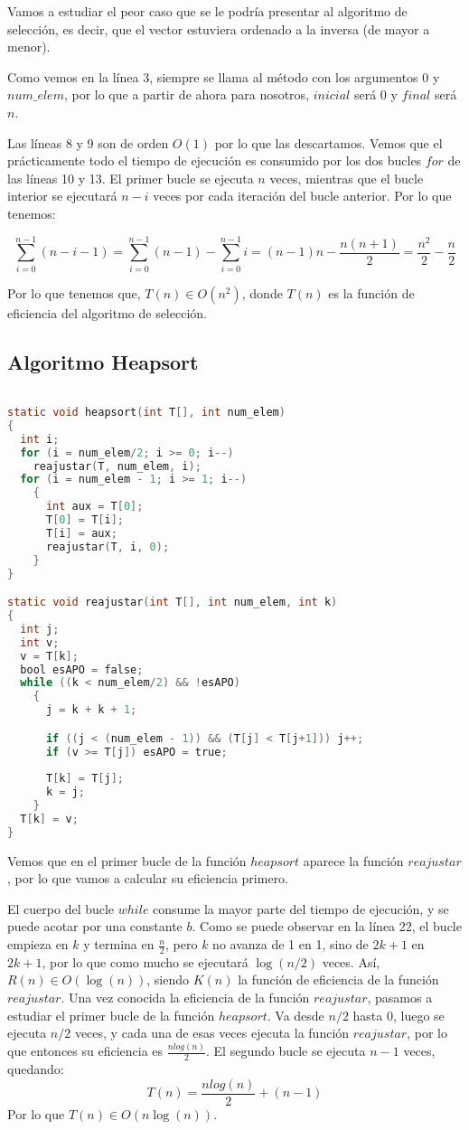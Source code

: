Vamos a estudiar el peor caso que se le podría presentar al algoritmo de selección, es decir, que el vector estuviera ordenado a la inversa (de mayor a menor).

Como vemos en la línea 3, siempre se llama al método con los argumentos $0$ y $num\_elem$, por lo que a partir de ahora para nosotros, $inicial$ será $0$ y $final$ será $n$.

Las líneas 8 y 9 son de orden $O(1)$ por lo que las descartamos. Vemos que el prácticamente todo el tiempo de ejecución es consumido por los dos bucles $for$ de las líneas 10 y 13. El primer bucle se ejecuta $n$ veces, mientras que el bucle interior se ejecutará $n-i$ veces por cada iteración del bucle anterior. Por lo que tenemos:

\[
\sum_{i=0}^{n-1}(n-i-1)=\sum_{i=0}^{n-1}(n-1)-\sum_{i=0}^{n-1}i=(n-1)n-\frac{n(n+1)}{2}=\frac{n^2}{2}-\frac{n}{2}
\]

Por lo que tenemos que, $T(n)\in O(n^2)$, donde $T(n)$ es la función de eficiencia del algoritmo de selección.

\newpage 

\subsection{Algoritmo Heapsort}

\begin{lstlisting}[language=C]

static void heapsort(int T[], int num_elem)
{
  int i;
  for (i = num_elem/2; i >= 0; i--)
    reajustar(T, num_elem, i);
  for (i = num_elem - 1; i >= 1; i--)
    {
      int aux = T[0];
      T[0] = T[i];
      T[i] = aux;
      reajustar(T, i, 0);
    }
} 

static void reajustar(int T[], int num_elem, int k)
{
  int j;
  int v;
  v = T[k];
  bool esAPO = false;
  while ((k < num_elem/2) && !esAPO)
    {
      j = k + k + 1;

      if ((j < (num_elem - 1)) && (T[j] < T[j+1])) j++;
      if (v >= T[j]) esAPO = true;
      
      T[k] = T[j];
      k = j;
    }
  T[k] = v;
}
\end{lstlisting}

Vemos que en el primer bucle de la función $heapsort$ aparece la función $reajustar$, por lo que vamos a calcular su eficiencia primero. 

El cuerpo del bucle $while$ consume la mayor parte del tiempo de ejecución, y se puede acotar por una constante $b$. Como se puede observar en la línea 22, el bucle empieza en $k$ y termina en $\frac{n}{2}$, pero $k$ no avanza de 1 en 1, sino de $2k+1$ en $2k+1$, por lo que como mucho se ejecutará $\log(n/2)$ veces. Así, $R(n) \in O(\log(n))$, siendo $K(n)$ la función de eficiencia de la función $reajustar$.
Una vez conocida la eficiencia de la función $reajustar$, pasamos a estudiar el primer bucle de la función $heapsort$. Va desde $n/2$ hasta $0$, luego se ejecuta $n/2$ veces, y cada una de esas veces ejecuta la función $reajustar$, por lo que entonces su eficiencia es $\frac{nlog(n)}{2}$. El segundo bucle se ejecuta $n-1$ veces, quedando:
\[T(n)=\frac{nlog(n)}{2}+(n-1)\]
Por lo que $T(n)\in O(n\log(n))$.

